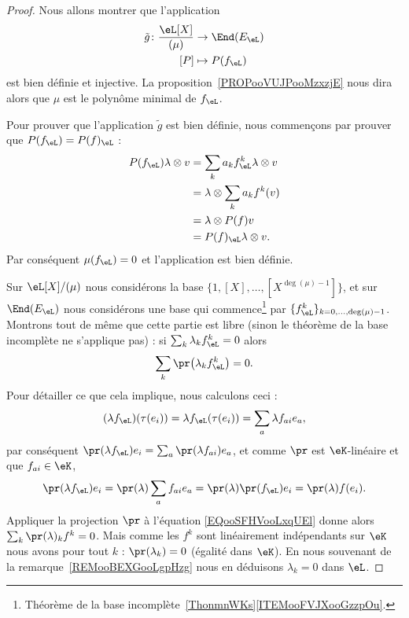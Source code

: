\begin{proof}
	Nous allons montrer que l'application
	\begin{equation}
		\begin{aligned}
			\tilde g\colon \frac{ \eL[X] }{ (\mu) } & \to \End(E_{\eL})  \\
			[P]                                     & \mapsto P(f_{\eL})
		\end{aligned}
	\end{equation}
	est bien définie et injective. La proposition~\ref{PROPooVUJPooMzxzjE} nous dira alors que \( \mu\) est le polynôme minimal de \( f_{\eL}\).

	Pour prouver que l'application \( \tilde g\) est bien définie, nous commençons par prouver que  \( P(f_{\eL})=P(f)_{\eL}\) :
	\begin{subequations}
		\begin{align}
			P(f_{\eL})\lambda\otimes v & =\sum_ka_kf_{\eL}^k\lambda\otimes v \\
			                           & =\lambda\otimes \sum_ka_kf^k(v)     \\
			                           & =\lambda\otimes P(f)v               \\
			                           & =P(f)_{\eL}\lambda\otimes v.
		\end{align}
	\end{subequations}
	Par conséquent \( \mu(f_{\eL})=0\) et l'application est bien définie.

	Sur \( \eL[X]/(\mu)\) nous considérons la base \( \{ 1,[X],\ldots, [X^{\deg(\mu)-1}] \}\), et sur \( \End(E_{\eL})\) nous considérons une base qui commence\footnote{Théorème de la base incomplète~\ref{ThonmnWKs}\ref{ITEMooFVJXooGzzpOu}.} par \( \{ f_{\eL}^k \}_{k=0,\ldots, \deg(\mu)-1}\). Montrons tout de même que cette partie est libre (sinon le théorème de la base incomplète ne s'applique pas) : si \( \sum_k\lambda_kf_{\eL}^k=0\) alors
	\begin{equation}        \label{EQooSFHVooLxqUEl}
		\sum_k\pr\big( \lambda_k f_{\eL}^k\big)=0.
	\end{equation}
	Pour détailler ce que cela implique, nous calculons ceci :
	\begin{equation}
		(\lambda f_{\eL})(\tau (e_i))=\lambda f_{\eL}(\tau (e_i))=\sum_a \lambda f_{ai}e_a,
	\end{equation}
	par conséquent \( \pr(\lambda f_{\eL})e_i=\sum_a\pr(\lambda f_{ai})e_a\), et comme \( \pr\) est \( \eK\)-linéaire et que \( f_{ai}\in \eK\),
	\begin{equation}
		\pr(\lambda f_{\eL})e_i=\pr(\lambda)\sum_a f_{ai}e_a=\pr(\lambda)\pr(f_\eL)e_i=\pr(\lambda)f(e_i).
	\end{equation}
	Appliquer la projection \( \pr\) à l'équation \eqref{EQooSFHVooLxqUEl} donne alors \( \sum_k\pr(\lambda)_kf^k=0\). Mais comme les \( f^k\) sont linéairement indépendants sur \( \eK\) nous avons pour tout \( k\) : \( \pr(\lambda_k)=0\) (égalité dans \( \eK\)). En nous souvenant de la remarque~\ref{REMooBEXGooLgpHzg} nous en déduisons \( \lambda_k=0\) dans \( \eL\).


\end{proof}
